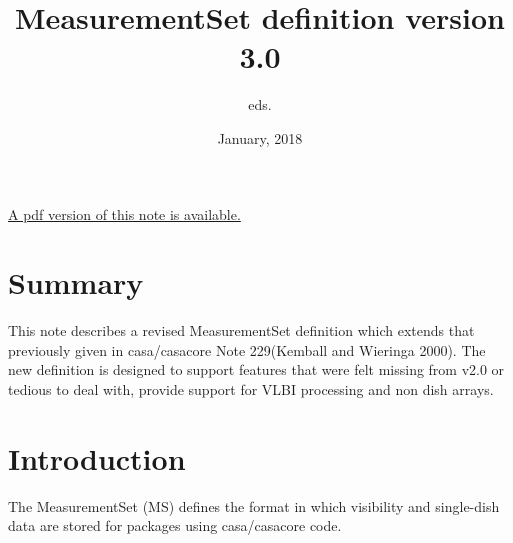 \documentclass{article}
\begin{document}
\title{MeasurementSet definition version 3.0}
\author{eds.}
\date{January, 2018}
\maketitle

\ifpdf
\else
\href{264.pdf}{A pdf version of this note is available.}
\fi

\tableofcontents 
\section{Summary} 

This note describes a revised MeasurementSet definition which extends
that previously given in casa/casacore Note 229(Kemball and Wieringa
2000).  The new definition is designed to support features that were
felt missing from v2.0 or tedious to deal with, provide support for
VLBI processing and non dish arrays.

\section{Introduction}

The MeasurementSet (MS) defines the format in which visibility and
single-dish data are stored for packages using casa/casacore code.
\end{document}
